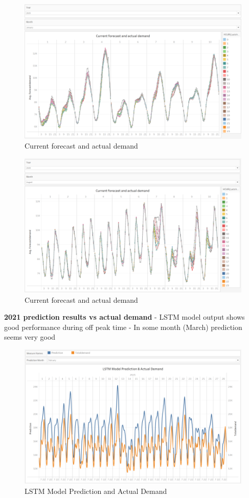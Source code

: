 \documentclass[mstat,12pt]{unswthesis}
\begin{document}
\begin{figure}[H]
\includegraphics{snapshots/Current forecast 1.png}
\caption{Current forecast and actual demand}\label{4.6}
\end{figure}

\begin{figure}[H]
\includegraphics{snapshots/Current forecast 2.png}
\caption{Current forecast and actual demand}\label{4.7}
\end{figure}

\textbf{2021 prediction results vs actual demand} \newline \newline -
LSTM model output shows good performance during off peak time \newline -
In some month (March) prediction seems very good

\begin{figure}[H]
\includegraphics{snapshots/Prediction 1.png}
\caption{LSTM Model Prediction and Actual Demand}\label{4.8}
\end{figure}
\end{document}
